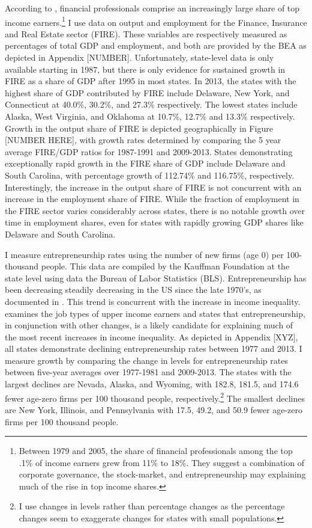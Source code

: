 \documentclass[11pt]{article}
\theoremstyle{definition}
\numberwithin{equation}{section}
\begin{document}
According to \cite{bakija2012jobs}, financial professionals comprise an increasingly large share of top income earners.\footnote{Between 1979 and 2005, the share of financial professionals among the top .1\% of income earners grew from 11\% to 18\%. They suggest a combination of corporate governance, the stock-market, and entrepreneurship may explaining much of the rise in top income shares.}  I use data on output and employment for the Finance, Insurance and Real Estate sector (FIRE). These variables are respectively measured as percentages of total GDP and employment, and both are provided by the BEA as depicted in Appendix [NUMBER]. Unfortunately, state-level data is only available starting in 1987, but there is only evidence for sustained growth in FIRE as a share of GDP after 1995 in most states. In 2013, the states with the highest share of GDP contributed by FIRE include Delaware, New York, and Connecticut at 40.0\%, 30.2\%, and 27.3\% respectively. The lowest states include Alaska, West Virginia, and Oklahoma at 10.7\%, 12.7\% and 13.3\% respectively. Growth in the output share of FIRE is depicted geographically in Figure [NUMBER HERE], with growth rates determined by comparing the 5 year average FIRE/GDP ratios for 1987-1991 and 2009-2013. States demonstrating exceptionally rapid growth in the FIRE share of GDP include Delaware and South Carolina, with percentage growth of 112.74\% and 116.75\%, respectively. Interestingly, the increase in the output share of FIRE is not concurrent with an increase in the employment share of FIRE. While the fraction of employment in the FIRE sector varies considerably across states, there is no notable growth over time in employment shares, even for states with rapidly growing GDP shares like Delaware and South Carolina.


I measure entrepreneurship rates using the number of new firms (age 0) per 100-thousand people. This data are compiled by the Kauffman Foundation at the state level using data the Bureau of Labor Statistics (BLS). Entrepreneurship has been decreasing steadily decreasing in the US since the late 1970's, as documented in \cite{decker2013secular,decker2014role,karahan2015understanding}. This trend is concurrent with the increase in income inequality. \cite{bakija2012jobs} examines the job types of upper income earners and states that entrepreneurship, in conjunction with other changes, is a likely candidate for explaining much of the most recent increases in income inequality. As depicted in Appendix [XYZ], all states demonstrate declining entrepreneurship rates between 1977 and 2013. I measure growth by comparing the change in levels for entrepreneurship rates between five-year averages over 1977-1981 and 2009-2013. The states with the largest declines are Nevada, Alaska, and Wyoming, with 182.8, 181.5, and 174.6 fewer age-zero firms per 100 thousand people, respectively.\footnote{I use changes in levels rather than percentage changes as the percentage changes seem to exaggerate changes for states with small populations.} The smallest declines are New York, Illinois, and Pennsylvania with 17.5, 49.2, and 50.9 fewer age-zero firms per 100 thousand people. 
\end{document}
